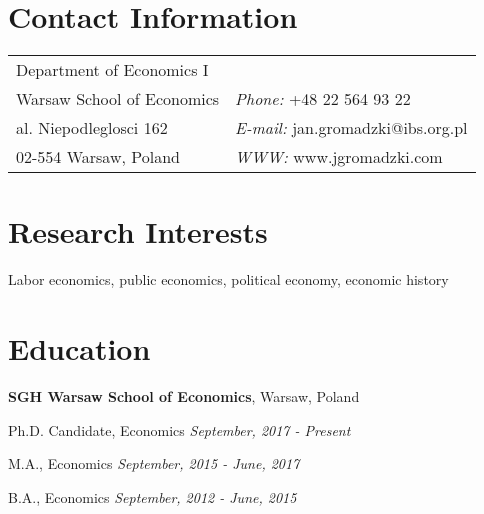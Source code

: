 \documentclass[margin,line]{res}
\newenvironment{list1}{
  \begin{list}{\ding{113}}{%
      \setlength{\itemsep}{0in}
      \setlength{\parsep}{0in} \setlength{\parskip}{0in}
      \setlength{\topsep}{0in} \setlength{\partopsep}{0in} 
      \setlength{\leftmargin}{0.17in}}}{\end{list}}
\newenvironment{list2}{
  \begin{list}{$\bullet$}{%
      \setlength{\itemsep}{0in}
      \setlength{\parsep}{0in} \setlength{\parskip}{0in}
      \setlength{\topsep}{0in} \setlength{\partopsep}{0in} 
      \setlength{\leftmargin}{0.2in}}}{\end{list}}
\begin{document}

\begin{resume}
\section{\sc Contact Information}
\vspace{.05in}
\begin{tabular}{@{}p{2in}p{4in}}            
Department of Economics I   \\         
Warsaw School of Economics & {\it Phone:}  +48 22 564 93 22\\ 
al. Niepodleglosci 162 & {\it E-mail:}  jan.gromadzki@ibs.org.pl\\       
02-554 Warsaw, Poland  & {\it WWW:} www.jgromadzki.com \\     
\end{tabular}


\section{\sc Research Interests}
Labor economics, public economics, political economy, economic history

\section{\sc Education}
{\bf SGH Warsaw School of Economics}, Warsaw, Poland\\
\vspace*{-.1in}
\begin{list1}
\item[] Ph.D. Candidate, Economics \textit{\hfill September, 2017 - Present}
\vspace*{.05in}
\item[] M.A., Economics \hfill \textit{September, 2015 - June, 2017}
\vspace*{.05in}
\item[] B.A., Economics \hfill \textit{September, 2012 - June, 2015}
\end{list1}


\end{resume}
\end{document}
